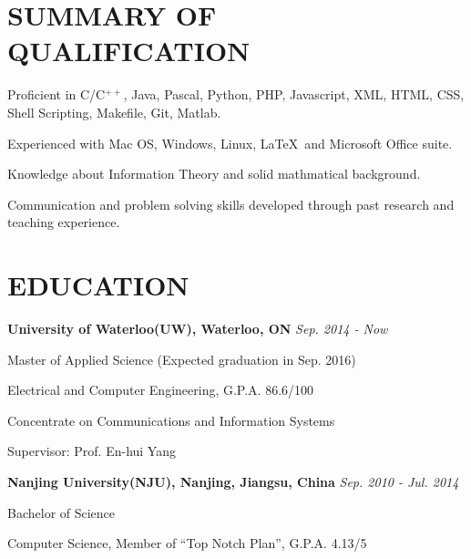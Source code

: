 \documentclass{res}
\newcommand{\parsp}{\vspace{-0.5\baselineskip}}
\newcommand{\additemindent}{\addtolength{\itemindent}{1em}}
\begin{document}
\begin{resume}


\parsp
\section{SUMMARY OF QUALIFICATION}
	\begin{asparaitem}
		\item 	Proficient in C/C$^{++}$, Java, Pascal, Python, PHP, Javascript, XML, HTML, CSS, Shell Scripting, 			Makefile, Git, Matlab.
		\item 	Experienced with Mac OS, Windows, Linux, \LaTeX\  and Microsoft Office suite.
		\item 	Knowledge about Information Theory and solid mathmatical background.
		\item 	Communication and problem solving skills developed through past research and teaching experience.
	\end{asparaitem}


\parsp
\section{EDUCATION}
	\textbf{University of Waterloo(UW), Waterloo, ON} \hfill \emph{Sep. 2014 - Now}
	\begin{asparaitem}[$\circ$]
		\additemindent
		\item Master of Applied Science (Expected graduation in Sep. 2016) 
		\item Electrical and Computer Engineering, G.P.A. 86.6/100
		\item Concentrate on Communications and Information Systems
		\item Supervisor: Prof. En-hui Yang
  	\end{asparaitem}

  	\vspace{-0.7\baselineskip}

	\textbf{Nanjing University(NJU), Nanjing, Jiangsu, China} \hfill \emph{Sep. 2010 - Jul. 2014}
	\begin{asparaitem}[$\circ$]
		\additemindent
		\item Bachelor of Science
		\item Computer Science, Member of ``Top Notch Plan'', G.P.A. 4.13/5
	\end{asparaitem}



\end{resume}
\end{document}
